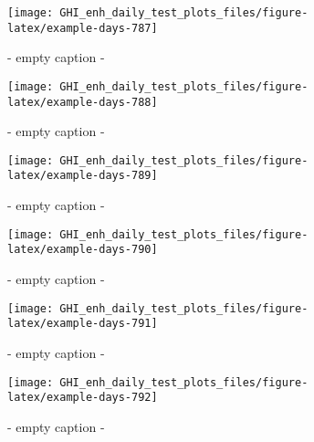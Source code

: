 \documentclass[
  10pt,
  a4paper,oneside]{article}
\begin{document}
\begin{figure}[H]

{\centering \texttt{[image: GHI\_enh\_daily\_test\_plots\_files/figure-latex/example-days-787]} 

}

\caption{ - empty caption - }\label{fig:example-days-787}
\end{figure}

\begin{figure}[H]

{\centering \texttt{[image: GHI\_enh\_daily\_test\_plots\_files/figure-latex/example-days-788]} 

}

\caption{ - empty caption - }\label{fig:example-days-788}
\end{figure}

\begin{figure}[H]

{\centering \texttt{[image: GHI\_enh\_daily\_test\_plots\_files/figure-latex/example-days-789]} 

}

\caption{ - empty caption - }\label{fig:example-days-789}
\end{figure}

\begin{figure}[H]

{\centering \texttt{[image: GHI\_enh\_daily\_test\_plots\_files/figure-latex/example-days-790]} 

}

\caption{ - empty caption - }\label{fig:example-days-790}
\end{figure}

\begin{figure}[H]

{\centering \texttt{[image: GHI\_enh\_daily\_test\_plots\_files/figure-latex/example-days-791]} 

}

\caption{ - empty caption - }\label{fig:example-days-791}
\end{figure}

\begin{figure}[H]

{\centering \texttt{[image: GHI\_enh\_daily\_test\_plots\_files/figure-latex/example-days-792]} 

}

\caption{ - empty caption - }\label{fig:example-days-792}
\end{figure}
\end{document}
